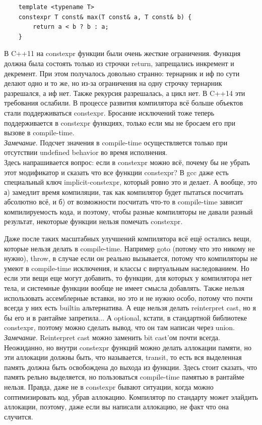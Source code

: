 \documentclass[12pt, a4paper]{article}
\begin{document}
\begin{verbatim}
	template <typename T>
	constexpr T const& max(T const& a, T const& b) {
		return a < b ? b : a;
	}
\end{verbatim}
\par В C++11 на constexpr функции были очень жесткие ограничения. Функция должна была состоять только из строчки return, запрещались инкремент и декремент. При этом получалось довольно странно: тернарник и иф по сути делают одно и то же, но из-за ограничения на одну строчку тернарник разрешался, а иф нет. Также рекурсия разрешалась, а цикл нет. В C++14 эти требования ослабили. В процессе развития компилятора всё больше объектов стали поддерживаться constexpr. Бросание исключений тоже теперь поддерживается в constexpr функциях, только если мы не бросаем его при вызове в compile-time.\\
\textit{Замечание}. Подсчет значения в compile-time осуществляется только при отсутствии undefined behavior во время исполнения.\\
Здесь напрашивается вопрос: если в constexpr можно всё, почему бы не убрать этот модификатор и сказать что все функции constexpr? В gcc даже есть специальный ключ implicit-constexpr, который ровно это и делает. А вообще, это а) замедлит время компиляции, так как компилятор будет пытаться посчитать абсолютно всё, и б) от возможности посчитать что-то в compile-time зависит компилируемость кода, и поэтому, чтобы разные компиляторы не давали разный результат, некоторые функции нельзя помечать constexpr.
\par Даже после таких масштабных улучшений компилятора всё ещё остались вещи, которые нельзя делать в compile-time. Например goto (потому что это никому не нужно), throw, в случае если он реально вызывается, потому что компиляторы не умеют в compile-time исключения, и классы с виртуальным наследованием. Но если эти вещи еще могут добавить, то функции, для которых у компилятора нет тела, и системные функции вообще не имеет смысла добавлять. Также нельзя использовать ассемблерные вставки, но это и не нужно особо, потому что почти всегда у них есть builtin альтернатива. А еще нельзя делать reinterpret cast, но я бы его и в рантайме запретила... А optional, кстати, в стандартной библиотеке constexpr, поэтому можно сделать вывод, что он там написан через union.
\\\textit{Замечание}. Reinterpret cast можно заменить bit cast'ом почти всегда.
\\Неожиданно, но внутри constexpr функций можно делать аллокации памяти, но эти аллокации должны быть, что называется, transit, то есть вся выделенная память должна быть освобождена до выхода из функции. Здесь стоит сказать, что память рельно выделяется, но пользоваться compile-time памятью в рантайме нельзя. Правда, даже не в constexpr бывают ситуации, когда можно соптимизировать код, убрав аллокацию. Компилятор по стандарту может элайдить аллокации, поэтому, даже если вы написали аллокацию, не факт что она случится.
\end{document}
